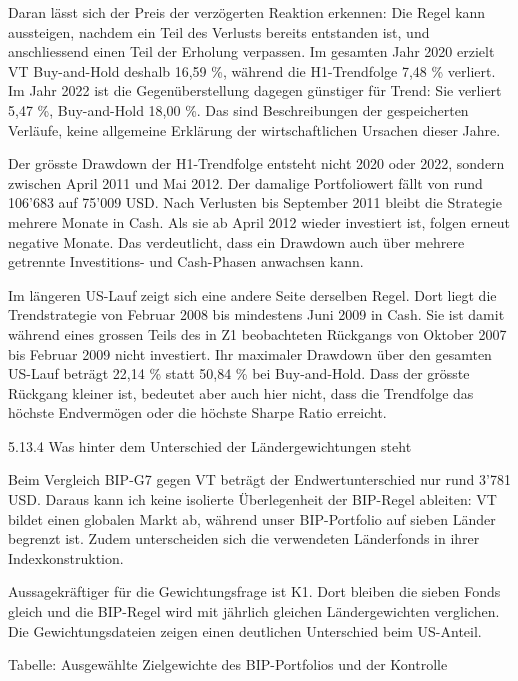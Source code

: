 \documentclass[
  ngerman,
  a4paper,
  DIV=11,
  oneside]{scrreprt}
\begin{document}
Daran lässt sich der Preis der verzögerten Reaktion erkennen: Die Regel
kann aussteigen, nachdem ein Teil des Verlusts bereits entstanden ist,
und anschliessend einen Teil der Erholung verpassen. Im gesamten Jahr
2020 erzielt VT Buy-and-Hold deshalb 16,59 \%, während die H1-Trendfolge
7,48 \% verliert. Im Jahr 2022 ist die Gegenüberstellung dagegen
günstiger für Trend: Sie verliert 5,47 \%, Buy-and-Hold 18,00 \%. Das
sind Beschreibungen der gespeicherten Verläufe, keine allgemeine
Erklärung der wirtschaftlichen Ursachen dieser Jahre.

Der grösste Drawdown der H1-Trendfolge entsteht nicht 2020 oder 2022,
sondern zwischen April 2011 und Mai 2012. Der damalige Portfoliowert
fällt von rund 106'683 auf 75'009 USD. Nach Verlusten bis September 2011
bleibt die Strategie mehrere Monate in Cash. Als sie ab April 2012
wieder investiert ist, folgen erneut negative Monate. Das verdeutlicht,
dass ein Drawdown auch über mehrere getrennte Investitions- und
Cash-Phasen anwachsen kann.

Im längeren US-Lauf zeigt sich eine andere Seite derselben Regel. Dort
liegt die Trendstrategie von Februar 2008 bis mindestens Juni 2009 in
Cash. Sie ist damit während eines grossen Teils des in Z1 beobachteten
Rückgangs von Oktober 2007 bis Februar 2009 nicht investiert. Ihr
maximaler Drawdown über den gesamten US-Lauf beträgt 22,14 \% statt
50,84 \% bei Buy-and-Hold. Dass der grösste Rückgang kleiner ist,
bedeutet aber auch hier nicht, dass die Trendfolge das höchste
Endvermögen oder die höchste Sharpe Ratio erreicht.

5.13.4 Was hinter dem Unterschied der Ländergewichtungen steht

Beim Vergleich BIP-G7 gegen VT beträgt der Endwertunterschied nur rund
3'781 USD. Daraus kann ich keine isolierte Überlegenheit der BIP-Regel
ableiten: VT bildet einen globalen Markt ab, während unser BIP-Portfolio
auf sieben Länder begrenzt ist. Zudem unterscheiden sich die verwendeten
Länderfonds in ihrer Indexkonstruktion.

Aussagekräftiger für die Gewichtungsfrage ist K1. Dort bleiben die
sieben Fonds gleich und die BIP-Regel wird mit jährlich gleichen
Ländergewichten verglichen. Die Gewichtungsdateien zeigen einen
deutlichen Unterschied beim US-Anteil.

Tabelle: Ausgewählte Zielgewichte des BIP-Portfolios und der Kontrolle
\end{document}
